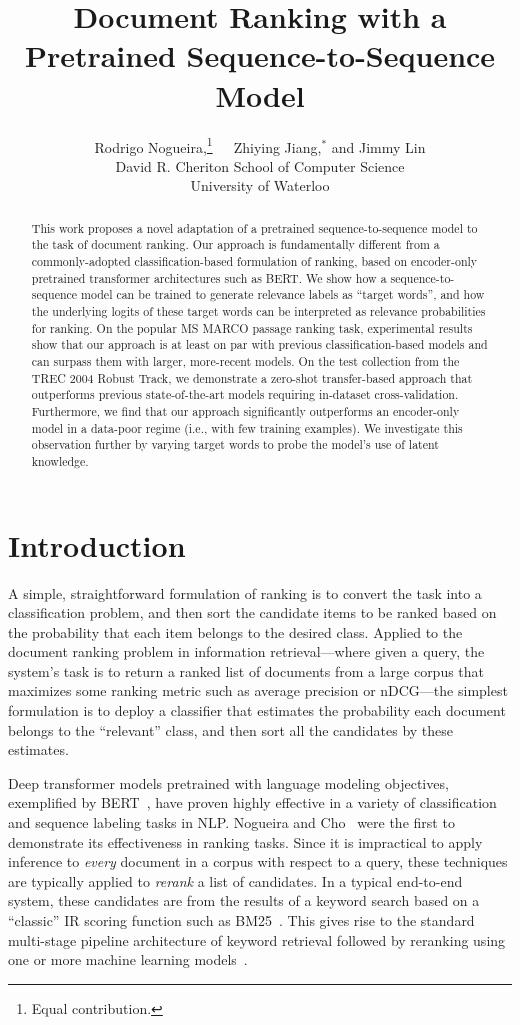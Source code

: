 \documentclass{article}
\title{Document Ranking with a Pretrained Sequence-to-Sequence Model}
\author{Rodrigo Nogueira,\thanks{Equal contribution.}~~~Zhiying Jiang,$^*$ and Jimmy Lin \\[1ex]
  David R. Cheriton School of Computer Science\\
  University of Waterloo\\
}
\begin{document}
\maketitle

\begin{abstract}
This work proposes a novel adaptation of a pretrained sequence-to-sequence model to the task of document ranking.
Our approach is fundamentally different from a commonly-adopted classification-based formulation of ranking, based on encoder-only pretrained transformer architectures such as BERT.
We show how a sequence-to-sequence model can be trained to generate relevance labels as ``target words'', and how the underlying logits of these target words can be interpreted as relevance probabilities for ranking.
On the popular MS MARCO passage ranking task, experimental results show that our approach is at least on par with previous classification-based models and can surpass them with larger, more-recent models.
On the test collection from the TREC 2004 Robust Track, we demonstrate a zero-shot transfer-based approach that outperforms previous state-of-the-art models requiring in-dataset cross-validation.
Furthermore, we find that our approach significantly outperforms an encoder-only model in a data-poor regime (i.e., with few training examples).
We investigate this observation further by varying target words to probe the model's use of latent knowledge.
\end{abstract}

\section{Introduction}

A simple, straightforward formulation of ranking is to convert the task into a classification problem, and then sort the candidate items to be ranked based on the probability that each item belongs to the desired class.
Applied to the document ranking problem in information retrieval---where given a query, the system's task is to return a ranked list of documents from a large corpus that maximizes some ranking metric such as average precision or nDCG---the simplest formulation is to deploy a classifier that estimates the probability each document belongs to the ``relevant'' class, and then sort all the candidates by these estimates.

Deep transformer models pretrained with language modeling objectives, exemplified by BERT~\cite{devlin-etal-2019-bert}, have proven highly effective in a variety of classification and sequence labeling tasks in NLP.
Nogueira and Cho~\cite{Nogueira:1901.04085:2019} were the first to demonstrate its effectiveness in ranking tasks.
Since it is impractical to apply inference to {\it every} document in a corpus with respect to a query, these techniques are typically applied to {\it rerank} a list of candidates.
In a typical end-to-end system, these candidates are from the results of a keyword search based on a ``classic'' IR scoring function such as BM25~\cite{robertson1995okapi}.
This gives rise to the standard multi-stage pipeline architecture of keyword retrieval followed by reranking using one or more machine learning models~\cite{Asadi_Lin_SIGIR2013,Nogueira_etal_arXiv2019_multistageBERT}.
\end{document}
